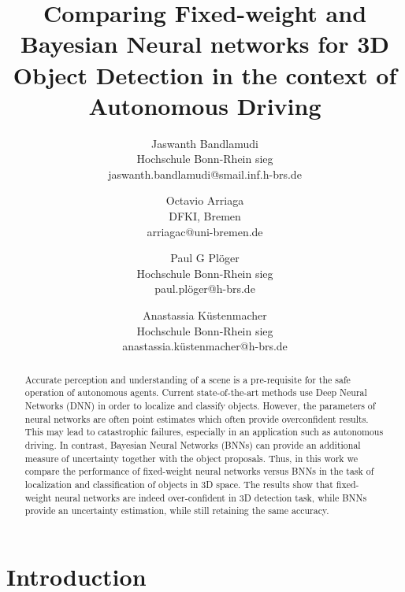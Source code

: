 \documentclass[10pt,twocolumn,letterpaper]{article}
\begin{document}
\title{Comparing Fixed-weight and Bayesian Neural networks for 3D Object Detection in the context of Autonomous Driving}

\author{Jaswanth Bandlamudi\\
Hochschule Bonn-Rhein sieg\\
jaswanth.bandlamudi@smail.inf.h-brs.de\\
\and 
Octavio Arriaga\\
DFKI, Bremen\\
arriagac@uni-bremen.de\\
\and
Paul G Pl\"{o}ger\\
Hochschule Bonn-Rhein sieg\\
paul.pl\"{o}ger@h-brs.de\\
\and
Anastassia K\"{u}stenmacher\\
Hochschule Bonn-Rhein sieg\\
anastassia.k\"{u}stenmacher@h-brs.de\\
}

\maketitle

\begin{abstract}
    Accurate perception and understanding of a scene is a pre-requisite for the safe operation of autonomous agents. Current state-of-the-art methods use Deep Neural Networks (DNN) in order to localize and classify objects. However, the parameters of neural networks are often point estimates which often provide overconfident results. This may lead to catastrophic failures, especially in an application such as autonomous driving. In contrast, Bayesian Neural Networks (BNNs) can provide an additional measure of uncertainty together with the object proposals. Thus, in this work we compare the performance of fixed-weight neural networks versus BNNs in the task of localization and classification of objects in 3D space. The results show that fixed-weight neural networks are indeed over-confident in 3D detection task, while BNNs provide an uncertainty estimation, while still retaining the same accuracy.
\end{abstract}

\section{Introduction}
\end{document}
